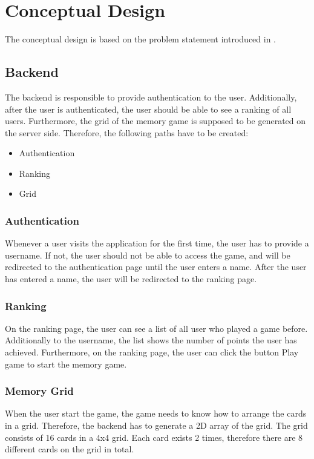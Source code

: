 \section{Conceptual Design}\label{sec:02_design}
The conceptual design is based on the problem statement introduced in .


\subsection{Backend}\label{subsec:02_design_backend}
The backend is responsible to provide authentication to the user. Additionally, after the user is authenticated, the user should be able to see a ranking of all users. Furthermore, the grid of the memory game is supposed to be generated on the server side.
Therefore, the following paths have to be created:
\begin{itemize}
\item Authentication 
\item Ranking 
\item Grid 
\end{itemize}

\subsubsection{Authentication}\label{subsubsec:02_design_backend_auth}
Whenever a user visits the application for the first time, the user has to provide a username. If not, the user should not be able to access the game, and will be redirected to the authentication page until the user enters a name.
After the user has entered a name, the user will be redirected to the ranking page.

\subsubsection{Ranking}\label{subsubsec:02_design_backend_ranking}
On the ranking page, the user can see a list of all user who played a game before. Additionally to the username, the list shows the number of points the user has achieved.
Furthermore, on the ranking page, the user can click the button Play game to start the memory game.

\subsubsection{Memory Grid}\label{subsubsec:02_design_backend_grid}
When the user start the game, the game needs to know how to arrange the cards in a grid. Therefore, the backend has to generate a 2D array of the grid.
The grid consists of 16 cards in a 4x4 grid. Each card exists 2 times, therefore there are 8 different cards on the grid in total.

